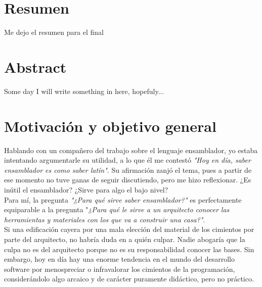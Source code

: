 
\chapter*{Resumen}
\thispagestyle{empty}
Me dejo el resumen para el final

\chapter*{Abstract}
\thispagestyle{empty}
Some day I will write something in here, hopefuly...

\chapter*{Motivación y objetivo general}

\thispagestyle{empty}
\vspace{1cm}

Hablando con un compañero del trabajo sobre el lenguaje ensamblador,
yo estaba intentando argumentarle su utilidad, a lo que él me contestó 
\emph{"Hoy en día, saber ensamblador es como saber latín"}.
Su afirmación zanjó el tema, pues a partir de ese momento no tuve ganas de
seguir discutiendo, pero me hizo reflexionar. ¿Es inútil el ensamblador?
¿Sirve para algo el bajo nivel?\\

Para mí, la pregunta \emph{"¿Para qué sirve saber ensamblador?"} es perfectamente equiparable a la pregunta "\emph{¿Para qué le sirve a un arquitecto conocer las herramientas y materiales con los que va a construir una casa?"}.\\

Si una edificación cayera por una mala elección del material de los cimientos por parte del arquitecto, no habría duda en a quién culpar. Nadie abogaría que la culpa no es del arquitecto porque no es su responsabilidad conocer las bases.
Sin embargo, hoy en día hay una enorme tendencia en el mundo del desarrollo software por menospreciar o infravalorar los cimientos de la programación, considerándolo algo arcaico y de carácter puramente didáctico, pero no
práctico.\\ 

